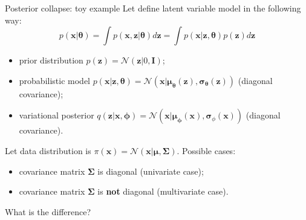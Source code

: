\documentclass{beamer}
\newcommand{\bx}{\mathbf{x}}
\newcommand{\bz}{\mathbf{z}}
\newcommand{\bmu}{\boldsymbol{\mu}}
\newcommand{\bsigma}{\boldsymbol{\sigma}}
\newcommand{\bSigma}{\boldsymbol{\Sigma}}
\newcommand{\btheta}{\boldsymbol{\theta}}
\newcommand{\bphi}{\boldsymbol{\phi}}
\begin{document}
\begin{frame}{Posterior collapse: toy example}
	Let define latent variable model in the following way:
	\[
		p(\bx | \btheta) = \int p(\bx, \bz | \btheta) d \bz = \int p(\bx | \bz, \btheta) p(\bz) d \bz 
	\]
	\begin{itemize}
		\item prior distribution $p(\bz) = \mathcal{N}(\bz| 0, \mathbf{I})$;
		\item probabilistic model $p(\bx | \bz, \btheta) = \mathcal{N}(\bx | \bmu_{\btheta}(\bz), \bsigma_{\btheta}(\bz))$ (diagonal covariance);
		\item variational posterior $q(\bz | \bx, \bphi) =  \mathcal{N}(\bx | \bmu_{\bphi}(\bx), \bsigma_{\phi}(\bx))$  (diagonal covariance).
	\end{itemize}
	
	Let data distribution is $\pi(\bx) = \mathcal{N}(\bx | \bmu, \bSigma)$. Possible cases:
	\begin{itemize}
		\item covariance matrix $\bSigma$ is diagonal (univariate case);
		\item covariance matrix $\bSigma$ is \textbf{not} diagonal (multivariate case).
	\end{itemize}
	What is the difference?
\end{frame}
\end{document}
